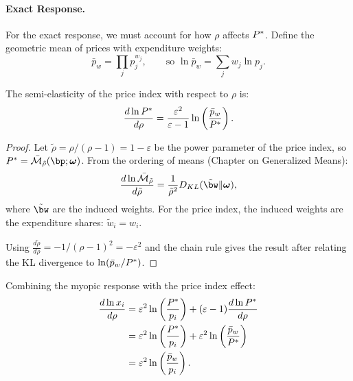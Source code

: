 \paragraph{Exact Response.}

For the exact response, we must account for how $\rho$ affects $P^{*}$. Define the geometric mean of prices with expenditure weights:
\begin{equation}
\bar{p}_w = \prod_j p_j^{w_j}, \qquad \text{so } \ln \bar{p}_w = \sum_j w_j \ln p_j.
\end{equation}

\begin{proposition}
\label{prop:dP-drho}
The semi-elasticity of the price index with respect to $\rho$ is:
\begin{equation}
\label{eq:dP-drho}
\frac{d \ln P^{*}}{d\rho} = \frac{\varepsilon^2}{\varepsilon - 1} \ln \left( \frac{\bar{p}_w}{P^{*}} \right).
\end{equation}
\end{proposition}

\begin{proof}
Let $\tilde{\rho} = \rho/(\rho-1) = 1 - \varepsilon$ be the power parameter of the price index, so $\Pstar = \Mbar_{\tilde{\rho}}(\bp; \bom)$. From the ordering of means (Chapter on Generalized Means):
\begin{equation}
\frac{d \ln \Mbar_{\tilde{\rho}}}{d\tilde{\rho}} = \frac{1}{\tilde{\rho}^2} D_{KL}(\tilde{\bw} \| \bom),
\end{equation}
where $\tilde{\bw}$ are the induced weights. For the price index, the induced weights are the expenditure shares: $\tilde{w}_i = w_i$.

Using $\frac{d\tilde{\rho}}{d\rho} = -1/(\rho-1)^2 = -\varepsilon^2$ and the chain rule gives the result after relating the KL divergence to $\ln(\bar{p}_w / P^{*})$.
\end{proof}

Combining the myopic response with the price index effect:
\begin{align}
\frac{d \ln x_i}{d\rho} &= \varepsilon^2 \ln \left( \frac{P^{*}}{p_i} \right) + (\varepsilon - 1) \frac{d \ln P^{*}}{d\rho} \notag \\
&= \varepsilon^2 \ln \left( \frac{P^{*}}{p_i} \right) + \varepsilon^2 \ln \left( \frac{\bar{p}_w}{P^{*}} \right) \notag \\
&= \varepsilon^2 \ln \left( \frac{\bar{p}_w}{p_i} \right).
\end{align}

